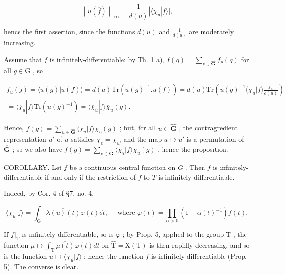 \[
\left\| u (\overline {{f}}) \right\| _ {\infty} = \frac {1}{d (u)} | \langle \chi_ {u} | f \rangle |,
\]

hence the first assertion, since the functions \(d(u)\) and \(\frac{1}{d(u)}\) are moderately increasing.

Assume that \(f\) is infinitely-differentiable; by Th. 1 a), \(f(g) = \sum_{u\in \hat{\mathbf{G}}}f_u(g)\) for all \(g\in \mathrm{G}\) , so

\[
\begin{array}{c} f _ {u} (g) = \langle u (g) | u (f) \rangle = d (u) \mathrm{Tr} (u (g) ^ {- 1}. u (f)) = d (u) \mathrm{Tr} \left(u (g) ^ {- 1} \langle \overline {{\chi}} _ {u} | f \rangle \frac {\varepsilon_ {u}}{d (u)}\right) \\ = \langle \overline {{\chi}} _ {u} | f \rangle \mathrm{Tr} (u (g) ^ {- 1}) = \langle \overline {{\chi}} _ {u} | f \rangle \overline {{\chi}} _ {u} (g). \end{array}
\]

Hence, \(f(g) = \sum_{u\in \hat{\mathbf{G}}}\langle \overline{\chi}_u|f\rangle \overline{\chi}_u(g)\) ; but, for all \(u\in \hat{\mathbf{G}}\) , the contragredient representation \(u'\) of \(u\) satisfies \(\overline{\chi}_u = \chi_{u'}\) and the map \(u\mapsto u'\) is a permutation of \(\hat{\mathbf{G}}\) ; so we also have \(f(g) = \sum_{u\in \hat{\mathbf{G}}}\langle \chi_u|f\rangle \chi_u(g)\) , hence the proposition.

COROLLARY. Let \(f\) be a continuous central function on \(G\) . Then \(f\) is infinitely-differentiable if and only if the restriction of \(f\) to \(T\) is infinitely-differentiable.

Indeed, by Cor. 4 of §7, no. 4,

\[
\langle \chi_ {u} | f \rangle = \int_ {\mathrm{G}} \overline {{\lambda (u) (t)}} \varphi (t) d t, \quad \text { where } \varphi (t) = \prod_ {\alpha > 0} (1 - \alpha (t) ^ {- 1}) f (t).
\]

If \(f|_{\mathrm{T}}\) is infinitely-differentiable, so is \(\varphi\) ; by Prop. 5, applied to the group \(\mathrm{T}\) , the function \(\mu \mapsto \int_{\mathrm{T}} \overline{\mu(t)} \varphi(t) dt\) on \(\hat{\mathrm{T}} = \mathrm{X}(\mathrm{T})\) is then rapidly decreasing, and so is the function \(u \mapsto \langle \chi_u | f \rangle\) ; hence the function \(f\) is infinitely-differentiable (Prop. 5). The converse is clear.

